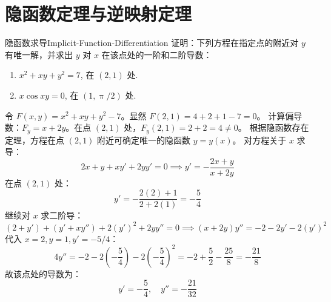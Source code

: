 \section{隐函数定理与逆映射定理}

\begin{problem}{隐函数求导}{Implicit-Function-Differentiation}
    证明：下列方程在指定点的附近对 $y$ 有唯一解，并求出 $y$ 对 $x$ 在该点处的一阶和二阶导数：
    \begin{enumerate}
        \item $x^2 + xy + y^2 = 7$, 在 $(2, 1)$ 处.
        \item $x \cos xy = 0$, 在 $(1, \uppi/2)$ 处.
    \end{enumerate}
\end{problem}

\begin{solution}
    令 $F(x, y) = x^2 + xy + y^2 - 7$。显然 $F(2, 1) = 4 + 2 + 1 - 7 = 0$。
    计算偏导数：$F_y = x + 2y$。在点 $(2, 1)$ 处，$F_y(2, 1) = 2 + 2 = 4 \neq 0$。
    根据隐函数存在定理，方程在点 $(2, 1)$ 附近可确定唯一的隐函数 $y = y(x)$。
    对方程关于 $x$ 求导：
    \begin{equation}
        2x + y + x y' + 2y y' = 0 \implies y' = -\frac{2x + y}{x + 2y}
    \end{equation}
    在点 $(2, 1)$ 处：
    \begin{equation}
        y' = -\frac{2(2) + 1}{2 + 2(1)} = -\frac{5}{4}
    \end{equation}
    继续对 $x$ 求二阶导：
    \begin{equation}
        (2 + y') + (y' + x y'') + 2(y')^2 + 2y y'' = 0 \implies (x + 2y)y'' = -2 - 2y' - 2(y')^2
    \end{equation}
    代入 $x=2, y=1, y'=-5/4$：
    \begin{equation}
        4y'' = -2 - 2\left(-\frac{5}{4}\right) - 2\left(-\frac{5}{4}\right)^2 = -2 + \frac{5}{2} - \frac{25}{8} = -\frac{21}{8}
    \end{equation}
    故该点处的导数为：
    \begin{equation}
        \boxed{y' = -\frac{5}{4}, \quad y'' = -\frac{21}{32}}
    \end{equation}


\end{solution}
